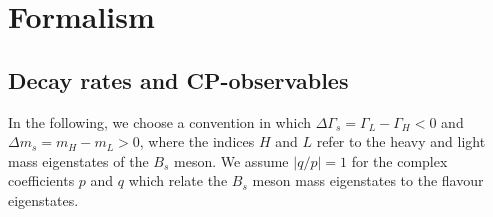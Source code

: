 \section{Formalism}

\subsection{Decay rates and CP-observables}

In the following, we choose a convention in which $\Delta\Gamma_s = \Gamma_L - \Gamma_H < 0$ and $\Delta m_s = m_H - m_L > 0$, where the indices $H$ and $L$ refer to the heavy and light mass eigenstates of the $B_s$ meson.
We assume $\vert q/p \vert = 1 $ for the complex coefficients $p$ and $q$ which relate the $B_s$ meson mass eigenstates to the flavour eigenstates.




